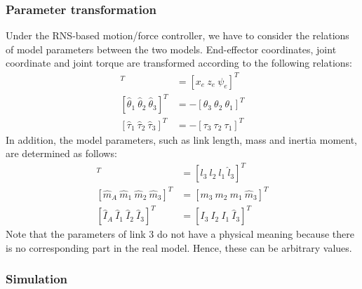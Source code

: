 \subsubsection{Parameter transformation}
Under the RNS-based motion/force controller,
we have to consider the relations of model parameters between the two models.
End-effector coordinates, joint coordinate and joint torque are transformed according to
the following relations:
%
\begin{align}
   [\hat{x}_{A}~\hat{z}_{A}~\hat{\psi}_{A}]^{T} &= [x_{e}~z_{e}~\psi_{e}]^{T}\\
   [\hat{\theta}_{1}~\hat{\theta}_{2}~\hat{\theta}_{3}]^{T} &= -[\theta_{3}~\theta_{2}~\theta_{1}]^{T}\\
   [\hat{\tau}_{1}~\hat{\tau}_{2}~\hat{\tau}_{3}]^{T} &= -[\tau_{3}~\tau_{2}~\tau_{1}]^{T}
\end{align}
%
In addition,
the model parameters, such as link length, mass and inertia moment,
are determined as follows:
%
\begin{align}
  [\hat{l}_{A}~\hat{l}_{1}~\hat{l}_{2}~\hat{l}_{3}]^{T} &= [l_{3}~l_{2}~l_{1}~\hat{l}_{3}]^{T}\\
  [\hat{m}_{A}~\hat{m}_{1}~\hat{m}_{2}~\hat{m}_{3}]^{T} &= [m_{3}~m_{2}~m_{1}~\hat{m}_{3}]^{T}\\
  [\hat{I}_{A}~\hat{I}_{1}~\hat{I}_{2}~\hat{I}_{3}]^{T} &= [I_{3}~I_{2}~I_{1}~\hat{I}_{3}]^{T}
\end{align}
%
Note that the parameters of link 3 do not have a physical meaning
because there is no corresponding part in the real model.
Hence, these can be arbitrary values.

\subsubsection{Simulation}

